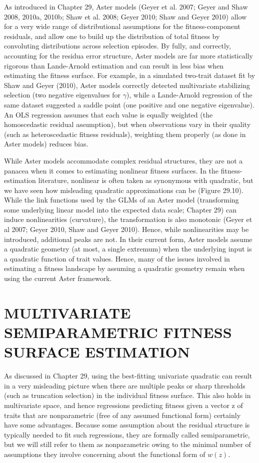 \documentclass{article}
\begin{document}
As introduced in Chapter 29, Aster models (Geyer et al. 2007; Geyer and Shaw 2008, 2010a, 2010b; Shaw et al. 2008; Geyer 2010; Shaw and Geyer 2010) allow for a very wide range of distributional assumptions for the fitness-component residuals, and allow one to build up the distribution of total fitness by convoluting distributions across selection episodes. By fully, and correctly, accounting for the residua error structure, Aster models are far more statistically rigorous than Lande-Arnold estimation and can result in less bias when estimating the fitness surface. For example, in a simulated two-trait dataset fit by Shaw and Geyer (2010), Aster models correctly detected multivariate stabilizing selection (two negative eigenvalues for  $ \gamma $), while a Lande-Arnold regression of the same dataset suggested a saddle point (one positive and one negative eigenvalue). An OLS regression assumes that each value is equally weighted (the homoscedastic residual assumption), but when observations vary in their quality (such as heteroscedastic fitness residuals), weighting them properly (as done in Aster models) reduces bias.

While Aster models accommodate complex residual structures, they are not a panacea when it comes to estimating nonlinear fitness surfaces. In the fitness-estimation literature, nonlinear is often taken as synonymous with quadratic, but we have seen how misleading quadratic approximations can be (Figure 29.10). While the link functions used by the GLMs of an Aster model (transforming some underlying linear model into the expected data scale; Chapter 29) can induce nonlinearities (curvature), the transformation is also monotonic (Geyer et al 2007; Geyer 2010, Shaw and Geyer 2010). Hence, while nonlinearities may be introduced, additional peaks are not. In their current form, Aster models assume a quadratic geometry (at most, a single extremum) when the underlying input is a quadratic function of trait values. Hence, many of the issues involved in estimating a fitness landscape by assuming a quadratic geometry remain when using the current Aster framework.

\section{MULTIVARIATE SEMIPARAMETRIC FITNESS SURFACE ESTIMATION}
As discussed in Chapter 29, using the best-fitting univariate quadratic can result in a very misleading picture when there are multiple peaks or sharp thresholds (such as truncation selection) in the individual fitness surface. This also holds in multivariate space, and hence regressions predicting fitness given a vector z of traits that are nonparametric (free of any assumed functional form) certainly have some advantages. Because some assumption about the residual structure is typically needed to fit such regressions, they are formally called semiparametric, but we will still refer to them as nonparametric owing to the minimal number of assumptions they involve concerning about the functional form of  $ w(z) $.
\end{document}
